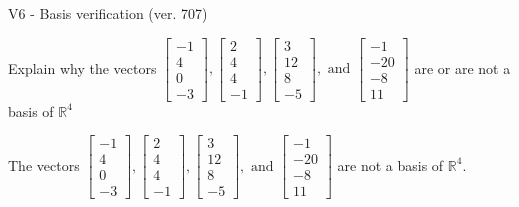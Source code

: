 \begin{exercise}
  \begin{exerciseTitle}V6 - Basis verification (ver. 707)\end{exerciseTitle}
  \begin{exerciseStatement}
    Explain why the vectors \(\left[\begin{array}{r}
-1 \\
4 \\
0 \\
-3
\end{array}\right] , \left[\begin{array}{r}
2 \\
4 \\
4 \\
-1
\end{array}\right] , \left[\begin{array}{r}
3 \\
12 \\
8 \\
-5
\end{array}\right] , \text{ and } \left[\begin{array}{r}
-1 \\
-20 \\
-8 \\
11
\end{array}\right]\) are or are not a basis of \(\mathbb{R}^4\)	


  \end{exerciseStatement}
  \begin{exerciseAnswer}
   The vectors \(\left[\begin{array}{r}
-1 \\
4 \\
0 \\
-3
\end{array}\right] , \left[\begin{array}{r}
2 \\
4 \\
4 \\
-1
\end{array}\right] , \left[\begin{array}{r}
3 \\
12 \\
8 \\
-5
\end{array}\right] , \text{ and } \left[\begin{array}{r}
-1 \\
-20 \\
-8 \\
11
\end{array}\right]\) 
  	 are not  a basis of \(\mathbb{R}^4\).
  


  \end{exerciseAnswer}
\end{exercise}